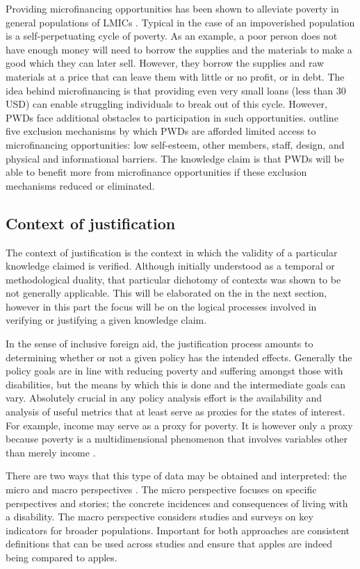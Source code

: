 \documentclass[a4paper]{article}
\begin{document}
Providing microfinancing opportunities has been shown to alleviate poverty in
general populations of LMICs \citep{wendt2006building}. Typical in the case of
an impoverished population is a self-perpetuating cycle of poverty. As an
example, a poor person does not have enough money will need to borrow the
supplies and the materials to make a good which they can later sell. However,
they borrow the supplies and raw materials at a price that can leave them with
little or no profit, or in debt. The idea behind microfinancing is that
providing even very small loans (less than 30 USD) can enable struggling
individuals to break out of this cycle. However, PWDs face additional
obstacles to participation in such opportunities. \cite{mersland2008access}
outline five exclusion mechanisms by which PWDs are afforded limited access to
microfinancing opportunities: low self-esteem, other members, staff, design,
and physical and informational barriers. The knowledge claim is that PWDs will
be able to benefit more from microfinance opportunities if these exclusion
mechanisms reduced or eliminated.

\subsection{Context of justification}

The context of justification is the context in which the validity of a
particular knowledge claimed is verified. Although initially understood as a
temporal or methodological duality, that particular dichotomy of contexts was
shown to be not generally applicable. This will be elaborated on the in the
next section, however in this part the focus will be on the logical processes
involved in verifying or justifying a given knowledge claim.

In the sense of inclusive foreign aid, the justification process amounts to
determining whether or not a given policy has the intended effects. Generally
the policy goals are in line with reducing poverty and suffering amongst those
with disabilities, but the means by which this is done and the intermediate
goals can vary. Absolutely crucial in any policy analysis effort is the
availability and analysis of useful metrics that at least serve as proxies for
the states of interest.  For example, income may serve as a proxy for poverty.
It is however only a proxy because poverty is a multidimensional phenomenon
that involves variables other than merely income
\cite{alkire2011understandings}. 

There are two ways that this type of data may be obtained and interpreted: the
micro and macro perspectives \citep{ingstad2011disability}. 
The micro perspective focuses on specific perspectives and stories; the
concrete incidences and consequences of living with a disability. The macro
perspective considers studies and surveys on key indicators for broader
populations. Important for both approaches are consistent definitions that can
be used across studies and ensure that apples are indeed being compared to
apples. 
\end{document}
